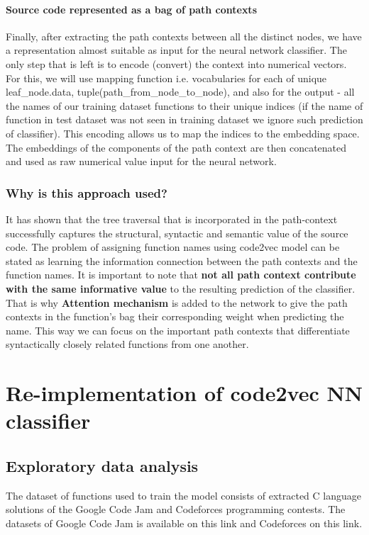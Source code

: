 \documentclass[10pt,english,a4paper]{report}
\begin{document}
\subsubsection{Source code represented as a bag of path contexts}
\quad Finally, after extracting the path contexts between all the distinct nodes, we have a representation almost suitable as input for the neural network classifier. The only step that is left is to encode (convert) the context into numerical vectors. For this, we will use mapping function i.e. vocabularies for each of unique leaf\_node.data,
tuple(path\_from\_node\_to\_node),
and also for the output - all the names of our training dataset functions to their unique indices (if the name of function in test dataset was not seen in training dataset we ignore such prediction of classifier).    
This encoding allows us to map the indices to the embedding space. The embeddings of the components of the path context are then concatenated and used as raw numerical value input for the neural network.

\subsection{Why is this approach used?}
It has shown that the tree traversal that is incorporated in the path-context successfully captures the structural, syntactic and semantic value of the source code\cite{alon}. The problem of assigning function names using code2vec model
can be stated as learning the information connection between the path contexts and the function names. It is important to note that \textbf{not all path context contribute with the same informative value} to the resulting prediction of the classifier. That is why \textbf{Attention mechanism} \cite{attention} is added to the network to give the path contexts in the function's bag their corresponding weight when predicting the name. This way we can focus on the important path contexts that differentiate syntactically closely related functions from one another.


\chapter{Re-implementation of code2vec NN classifier}

\section{Exploratory data analysis}
\label{item:EDA}
The dataset of functions used to train the model consists of extracted C language solutions of the Google Code Jam and Codeforces programming contests. The datasets of Google Code Jam is available on this link and Codeforces on this link.
\end{document}
